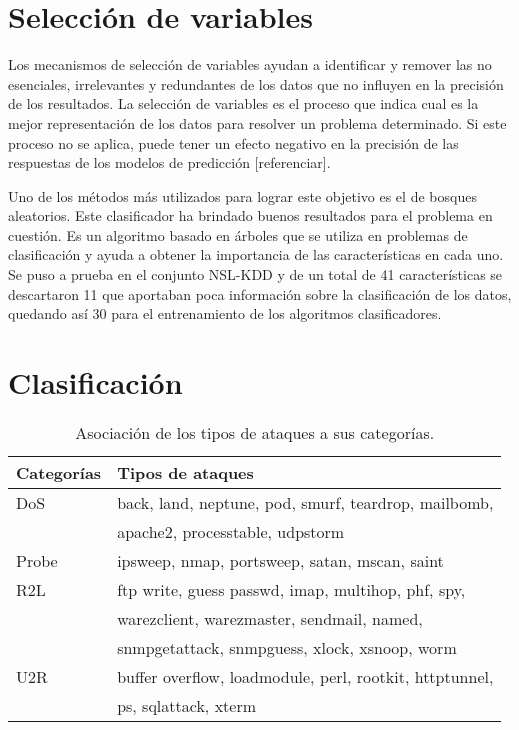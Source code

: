 \section{Selección de variables}
Los mecanismos de selección de variables ayudan a identificar y remover las no esenciales, irrelevantes y redundantes de los datos que no influyen en la precisión de los resultados. La selección de variables es el proceso que indica cual es la mejor representación de los datos para resolver un problema determinado. Si este proceso no se aplica, puede tener un efecto negativo en la precisión de las respuestas de los modelos de predicción [referenciar].

Uno de los métodos más utilizados para lograr este objetivo es el de bosques aleatorios. Este clasificador ha brindado buenos resultados para el problema en cuestión. Es un algoritmo basado en árboles que se utiliza en problemas de clasificación y ayuda a obtener la importancia de las características en cada uno. Se puso a prueba en el conjunto NSL-KDD y de un total de 41 características se descartaron 11 que aportaban poca información sobre la clasificación de los datos, quedando así 30 para el entrenamiento de los algoritmos clasificadores.

\section{Clasificación}
\begin{table}[b]
    \begin{center}
        \caption{Asociación de los tipos de ataques a sus categorías.}
        
        \label{tab:class}
        \begin{tabular}{l|l} %
        \textbf{Categorías} & \textbf{Tipos de ataques}\\
        \hline
        DoS & back, land, neptune, pod, smurf, teardrop, mailbomb,\\ 
        & apache2, processtable, udpstorm\\
        Probe & ipsweep, nmap, portsweep, satan, mscan, saint\\
        R2L & ftp write, guess passwd, imap, multihop, phf, spy,\\
        & warezclient, warezmaster, sendmail, named,\\
        & snmpgetattack, snmpguess, xlock, xsnoop, worm\\
        U2R & buffer overflow, loadmodule, perl, rootkit, httptunnel,\\
        & ps, sqlattack, xterm\\
        \end{tabular}
    \end{center}
\end{table}

